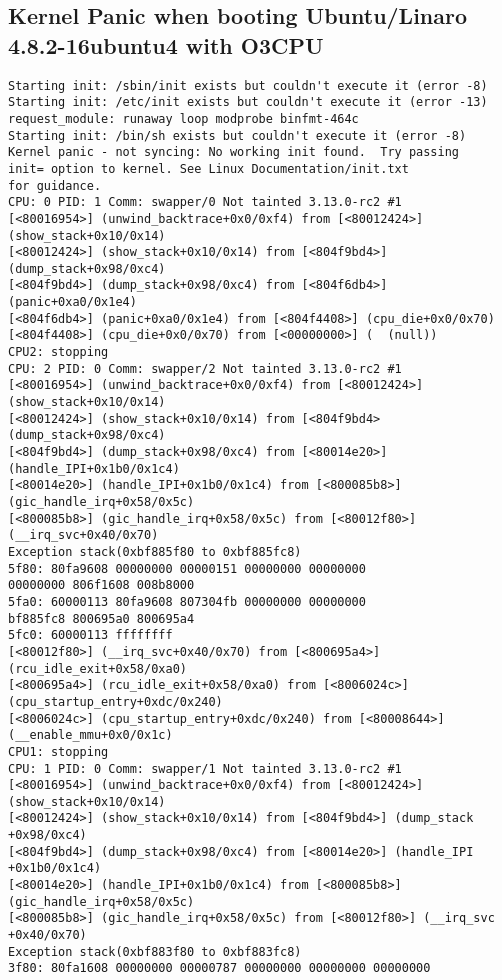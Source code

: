 \documentclass{article}
\begin{document}
\subsection{Kernel Panic when booting Ubuntu/Linaro 4.8.2-16ubuntu4 with O3CPU}
\begin{lstlisting}
Starting init: /sbin/init exists but couldn't execute it (error -8)
Starting init: /etc/init exists but couldn't execute it (error -13)
request_module: runaway loop modprobe binfmt-464c
Starting init: /bin/sh exists but couldn't execute it (error -8)
Kernel panic - not syncing: No working init found.  Try passing
init= option to kernel. See Linux Documentation/init.txt
for guidance.
CPU: 0 PID: 1 Comm: swapper/0 Not tainted 3.13.0-rc2 #1
[<80016954>] (unwind_backtrace+0x0/0xf4) from [<80012424>]
(show_stack+0x10/0x14)
[<80012424>] (show_stack+0x10/0x14) from [<804f9bd4>]
(dump_stack+0x98/0xc4)
[<804f9bd4>] (dump_stack+0x98/0xc4) from [<804f6db4>]
(panic+0xa0/0x1e4)
[<804f6db4>] (panic+0xa0/0x1e4) from [<804f4408>] (cpu_die+0x0/0x70)
[<804f4408>] (cpu_die+0x0/0x70) from [<00000000>] (  (null))
CPU2: stopping
CPU: 2 PID: 0 Comm: swapper/2 Not tainted 3.13.0-rc2 #1
[<80016954>] (unwind_backtrace+0x0/0xf4) from [<80012424>]
(show_stack+0x10/0x14)
[<80012424>] (show_stack+0x10/0x14) from [<804f9bd4>
(dump_stack+0x98/0xc4)
[<804f9bd4>] (dump_stack+0x98/0xc4) from [<80014e20>]
(handle_IPI+0x1b0/0x1c4)
[<80014e20>] (handle_IPI+0x1b0/0x1c4) from [<800085b8>]
(gic_handle_irq+0x58/0x5c)
[<800085b8>] (gic_handle_irq+0x58/0x5c) from [<80012f80>]
(__irq_svc+0x40/0x70)
Exception stack(0xbf885f80 to 0xbf885fc8)
5f80: 80fa9608 00000000 00000151 00000000 00000000
00000000 806f1608 008b8000
5fa0: 60000113 80fa9608 807304fb 00000000 00000000
bf885fc8 800695a0 800695a4
5fc0: 60000113 ffffffff
[<80012f80>] (__irq_svc+0x40/0x70) from [<800695a4>]
(rcu_idle_exit+0x58/0xa0)
[<800695a4>] (rcu_idle_exit+0x58/0xa0) from [<8006024c>]
(cpu_startup_entry+0xdc/0x240)
[<8006024c>] (cpu_startup_entry+0xdc/0x240) from [<80008644>]
(__enable_mmu+0x0/0x1c)
CPU1: stopping
CPU: 1 PID: 0 Comm: swapper/1 Not tainted 3.13.0-rc2 #1
[<80016954>] (unwind_backtrace+0x0/0xf4) from [<80012424>] 
(show_stack+0x10/0x14)
[<80012424>] (show_stack+0x10/0x14) from [<804f9bd4>] (dump_stack
+0x98/0xc4)
[<804f9bd4>] (dump_stack+0x98/0xc4) from [<80014e20>] (handle_IPI
+0x1b0/0x1c4)
[<80014e20>] (handle_IPI+0x1b0/0x1c4) from [<800085b8>] 
(gic_handle_irq+0x58/0x5c)
[<800085b8>] (gic_handle_irq+0x58/0x5c) from [<80012f80>] (__irq_svc
+0x40/0x70)
Exception stack(0xbf883f80 to 0xbf883fc8)
3f80: 80fa1608 00000000 00000787 00000000 00000000 00000000

\end{lstlisting}
\end{document}
